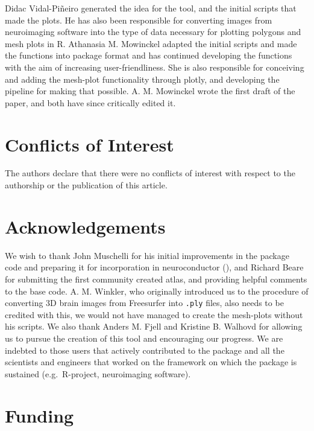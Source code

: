 \documentclass[fleqn,10pt]{wlpeerj} %
\begin{document}
Didac Vidal-Piñeiro generated the idea for the tool, and the initial scripts that made the plots.
He has also been responsible for converting images from neuroimaging software into the type of data necessary for plotting polygons and mesh plots in R.
Athanasia M. Mowinckel adapted the initial scripts and made the functions into package format and has continued developing the functions with the aim of increasing user-friendliness.
She is also responsible for conceiving and adding the mesh-plot functionality through plotly, and developing the pipeline for making that possible.
A. M. Mowinckel wrote the first draft of the paper, and both have since critically edited it.

\hypertarget{conflicts-of-interest}{%
\section{Conflicts of Interest}\label{conflicts-of-interest}}

The authors declare that there were no conflicts of interest with respect to the authorship or the publication of this article.

\hypertarget{acknowledgements}{%
\section{Acknowledgements}\label{acknowledgements}}

We wish to thank John Muschelli for his initial improvements in the package code and preparing it for incorporation in neuroconductor (\citeyearpar{neuroconductor}), and Richard Beare for submitting the first community created atlas, and providing helpful comments to the base code.
A. M. Winkler, who originally introduced us to the procedure of converting 3D brain images from Freesurfer into \texttt{.ply} files, also needs to be credited with this, we would not have managed to create the mesh-plots without his scripts.
We also thank Anders M. Fjell and Kristine B. Walhovd for allowing us to pursue the creation of this tool and encouraging our progress.
We are indebted to those users that actively contributed to the package and all the scientists and engineers that worked on the framework on which the package is sustained (e.g.~R-project, neuroimaging software).

\hypertarget{funding}{%
\section{Funding}\label{funding}}
\end{document}
